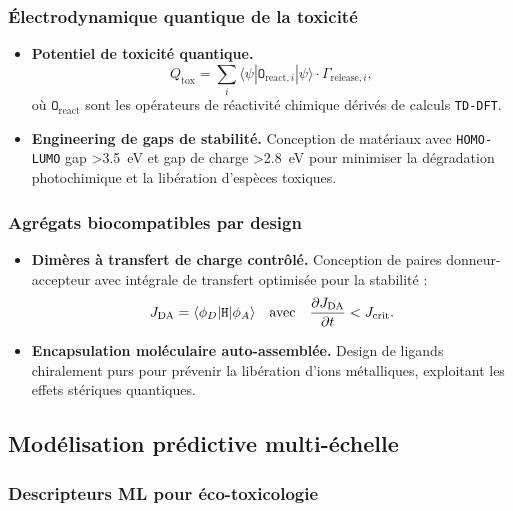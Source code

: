\documentclass[12pt, a4paper]{article}
\begin{document}
\subsubsection{Électrodynamique quantique de la toxicité}

\begin{itemize}
    \item \textbf{Potentiel de toxicité quantique.}
    \begin{equation}
    Q_{\text{tox}} = \sum_i \langle \psi | \mathtt{O}_{\text{react},i} | \psi \rangle \cdot \Gamma_{\text{release},i},
    \end{equation}
    où $\mathtt{O}_{\text{react}}$ sont les opérateurs de réactivité chimique dérivés de calculs \texttt{TD-DFT}.
    
    \item \textbf{Engineering de gaps de stabilité.} Conception de matériaux avec \texttt{HOMO-LUMO} gap \SI{>3.5}{\electronvolt} et gap de charge \SI{>2.8}{\electronvolt} pour minimiser la dégradation photochimique et la libération d'espèces toxiques.
\end{itemize}

\subsubsection{Agrégats biocompatibles par design}

\begin{itemize}
    \item \textbf{Dimères à transfert de charge contrôlé.} Conception de paires donneur-accepteur avec intégrale de transfert optimisée pour la stabilité :
    \begin{equation}
    J_{\text{DA}} = \langle \phi_D | \mathtt{H} | \phi_A \rangle \quad \text{avec} \quad \pdv{J_{\text{DA}}}{t} < J_{\text{crit}}.
    \end{equation}
    
    \item \textbf{Encapsulation moléculaire auto-assemblée.} Design de ligands chiralement purs pour prévenir la libération d'ions métalliques, exploitant les effets stériques quantiques.
\end{itemize}

\subsection{Modélisation prédictive multi-échelle}

\subsubsection{Descripteurs ML pour éco-toxicologie}
\end{document}
